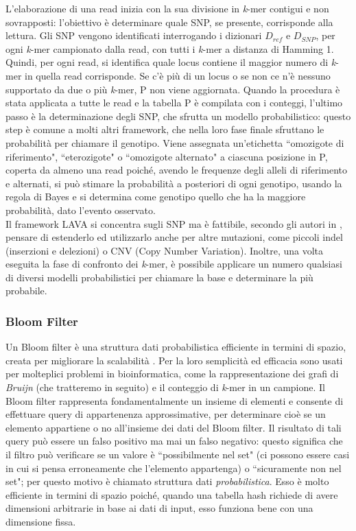 \documentclass[../main.tex]{subfiles}
\begin{document}
L'elaborazione di una read inizia con la sua divisione in \textit{k}-mer contigui e non sovrapposti: l'obiettivo è determinare quale SNP, se presente, corrisponde alla lettura. Gli SNP vengono identificati interrogando i dizionari $D_{ref}$ e $D_{SNP}$, per ogni \textit{k}-mer campionato dalla read, con tutti i \textit{k}-mer a distanza di Hamming 1. Quindi, per ogni read, si identifica quale locus contiene il maggior numero di \textit{k}-mer in quella read corrisponde. Se c'è più di un locus o se non ce n'è nessuno supportato da due o più \textit{k}-mer, P non viene aggiornata. Quando la procedura è stata applicata a tutte le read e la tabella P è compilata con i conteggi, l'ultimo passo è la determinazione degli SNP, che sfrutta un modello probabilistico: questo step è comune a molti altri framework, che nella loro fase finale sfruttano le probabilità per chiamare il genotipo. Viene assegnata un'etichetta ``omozigote di riferimento", ``eterozigote" o ``omozigote alternato" a ciascuna posizione in P, coperta da almeno una read poiché, avendo le frequenze degli alleli di riferimento e alternati, si può stimare la probabilità a posteriori di ogni genotipo, usando la regola di Bayes e si determina come genotipo quello che ha la maggiore probabilità, dato l'evento osservato. \\

\noindent
Il framework LAVA si concentra sugli SNP ma è fattibile, secondo gli autori in  \cite{shajii2016lava}, pensare di estenderlo ed utilizzarlo anche per altre mutazioni, come piccoli indel (inserzioni e delezioni) o CNV (Copy Number Variation). Inoltre, una volta eseguita la fase di confronto dei \textit{k}-mer, è possibile applicare un numero qualsiasi di diversi modelli probabilistici per chiamare la base e determinare la più probabile. 

\subsubsection{Bloom Filter}
\label{BloomFilter}
Un Bloom filter è una struttura dati probabilistica efficiente in termini di spazio, creata per migliorare la scalabilità \cite{sun-medvedev2018vargeno}. Per la loro semplicità ed efficacia sono usati per molteplici problemi in bioinformatica, come la rappresentazione dei grafi di \textit{Bruijn} (che tratteremo in seguito) e il conteggio di \textit{k}-mer in un campione. Il Bloom filter rappresenta fondamentalmente un insieme di elementi e consente di effettuare query di appartenenza approssimative, per determinare cioè se un elemento appartiene o no all'insieme dei dati del Bloom filter. Il risultato di tali query può essere un falso positivo ma mai un falso negativo: questo significa che il filtro può verificare se un valore è ``possibilmente nel set" (ci possono essere casi in cui si pensa erroneamente che l'elemento appartenga) o ``sicuramente non nel set"; per questo motivo è chiamato struttura dati \textit{probabilistica}. Esso è molto efficiente in termini di spazio poiché, quando una tabella hash richiede di avere dimensioni arbitrarie in base ai dati di input, esso funziona bene con una dimensione fissa.
\end{document}
